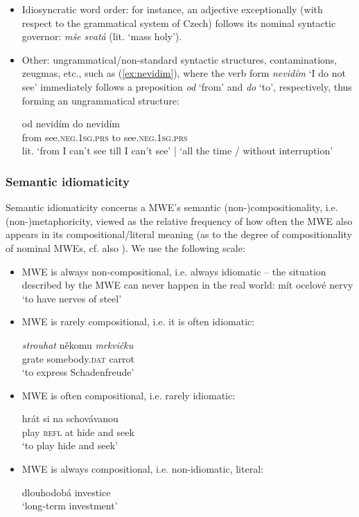 \documentclass[output=paper,colorlinks,citecolor=brown]{langscibook}
\begin{document}
\begin{itemize}
    \item Idiosyncratic word order: for instance, an adjective exceptionally (with respect to the grammatical system of Czech) follows its nominal syntactic governor: \emph{mše svatá} (lit. ‘mass holy’).

    \item Other: ungrammatical/non-standard syntactic structures, contaminations, zeugmas, etc., such as
(\ref{ex:nevidim}), where the verb form \emph{nevidím} ‘I do not see’ immediately follows a preposition \emph{od} ‘from’ and \emph{do} ‘to’, respectively, thus forming an ungrammatical structure:

\ea \label{ex:nevidim}
\gll od nevidím do nevidím\\
     from see.\textsc{neg}.\textsc{1sg.prs} to see.\textsc{neg}.\textsc{1sg.prs}\\
\glt lit. `from I can't see till I can't see' | `all the time / without interruption'
\z  

\end{itemize}

\subsubsection{Semantic idiomaticity}
\label{sec:idiom-sem}
Semantic idiomaticity concerns a MWE's semantic (non-)compositionality, i.e. (non-)metaphoricity, viewed as the relative frequency of how often the MWE also appears in its compositional/literal meaning (as to the degree of compositionality of nominal MWEs, cf. also  ).
We use the following scale:

\begin{itemize}
    \item MWE is always non-compositional, i.e. always idiomatic -- the situation described by the MWE can never happen in the real world: 
\ea \label{nervy}
  mít ocelové nervy\\
  `to have nerves of steel'
\z

    \item MWE is rarely compositional, i.e. it is often idiomatic: 

\ea
\gll \emph{strouhat} někomu \emph{mrkvičku}\\
     grate somebody.\textsc{dat} carrot\\
\glt `to express Schadenfreude' %
\z  

    \item MWE is often compositional, i.e. rarely idiomatic: 

\ea \label{schovavana}
\gll hrát si na schovávanou\\
     play \textsc{refl} at {hide and seek}\\
\glt `to play hide and seek'
\z 

    \item MWE is always compositional, i.e. non-idiomatic, literal:

\ea
dlouhodobá investice\\
`long-term investment'
\z 

\end{itemize}
\end{document}
